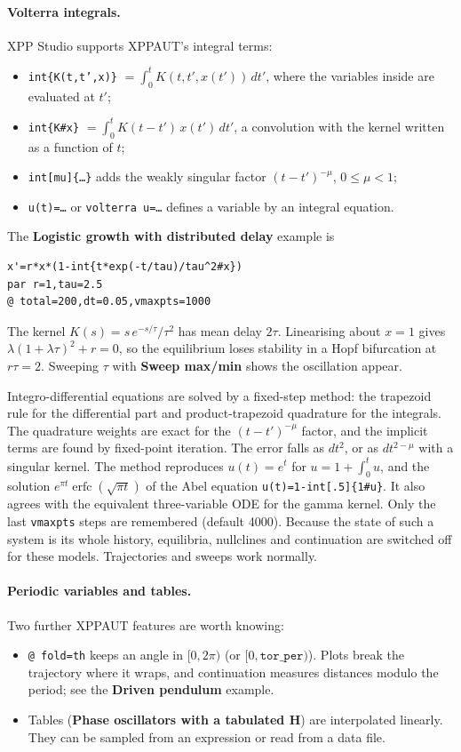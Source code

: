 \documentclass[11pt,a4paper]{article}
\newcommand{\XS}{\textsf{XPP Studio}}
\newcommand{\XPP}{\textsf{XPPAUT}}
\newcommand{\ui}[1]{\textsf{\textbf{#1}}}          %
\begin{document}
\paragraph{Volterra integrals.} \XS{} supports \XPP{}'s integral terms:
\begin{itemize}
  \item \texttt{int\{K(t,t',x)\}} $=\int_0^t K(t,t',x(t'))\,dt'$, where the variables inside are evaluated at $t'$;
  \item \texttt{int\{K\#x\}} $=\int_0^t K(t-t')\,x(t')\,dt'$, a convolution with the kernel written as a function of $t$;
  \item \texttt{int[mu]\{\ldots\}} adds the weakly singular factor $(t-t')^{-\mu}$, $0\le\mu<1$;
  \item \texttt{u(t)=\ldots} or \texttt{volterra u=\ldots} defines a variable by an integral equation.
\end{itemize}
The \ui{Logistic growth with distributed delay} example is
\begin{lstlisting}
x'=r*x*(1-int{t*exp(-t/tau)/tau^2#x})
par r=1,tau=2.5
@ total=200,dt=0.05,vmaxpts=1000
\end{lstlisting}
The kernel $K(s)=s\,e^{-s/\tau}/\tau^2$ has mean delay $2\tau$. Linearising about $x=1$ gives $\lambda(1+\lambda\tau)^2+r=0$, so the equilibrium loses stability in a Hopf bifurcation at $r\tau=2$. Sweeping $\tau$ with \ui{Sweep max/min} shows the oscillation appear.

Integro-differential equations are solved by a fixed-step method: the trapezoid rule for the differential part and product-trapezoid quadrature \cite{linz1985} for the integrals. The quadrature weights are exact for the $(t-t')^{-\mu}$ factor, and the implicit terms are found by fixed-point iteration. The error falls as $dt^2$, or as $dt^{2-\mu}$ with a singular kernel. The method reproduces $u(t)=e^t$ for $u=1+\int_0^t u$, and the solution $e^{\pi t}\operatorname{erfc}(\sqrt{\pi t})$ of the Abel equation \texttt{u(t)=1-int[.5]\{1\#u\}}. It also agrees with the equivalent three-variable ODE for the gamma kernel. Only the last \texttt{vmaxpts} steps are remembered (default 4000). Because the state of such a system is its whole history, equilibria, nullclines and continuation are switched off for these models. Trajectories and sweeps work normally.

\paragraph{Periodic variables and tables.} Two further \XPP{} features are worth knowing:
\begin{itemize}
  \item \texttt{@ fold=th} keeps an angle in $[0,2\pi)$ (or $[0,\texttt{tor\_per})$). Plots break the trajectory where it wraps, and continuation measures distances modulo the period; see the \ui{Driven pendulum} example.
  \item Tables (\ui{Phase oscillators with a tabulated H}) are interpolated linearly. They can be sampled from an expression or read from a data file.
\end{itemize}
\end{document}
